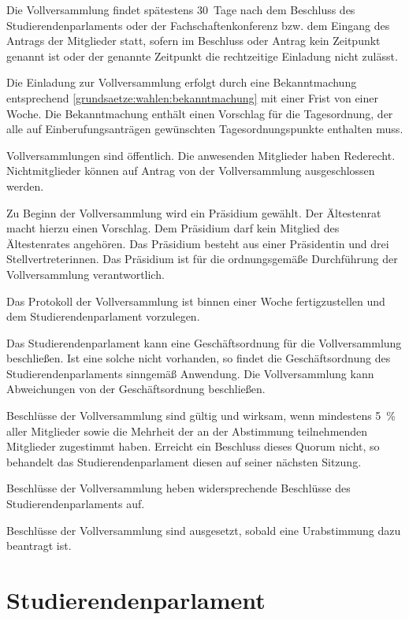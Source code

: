 \begin{contract}
Die Vollversammlung findet spätestens 30~Tage nach dem Beschluss des Studierendenparlaments oder der Fachschaftenkonferenz bzw. dem Eingang des Antrags der Mitglieder statt, sofern im Beschluss oder Antrag kein Zeitpunkt genannt ist oder der genannte Zeitpunkt die rechtzeitige Einladung nicht zulässt.

Die Einladung zur Vollversammlung erfolgt durch eine Bekanntmachung entsprechend \ref{grundsaetze:wahlen:bekanntmachung} mit einer Frist von einer Woche. Die Bekanntmachung enthält einen Vorschlag für die Tagesordnung, der alle auf Einberufungsanträgen gewünschten Tagesordnungspunkte enthalten muss.

Vollversammlungen sind öffentlich. Die anwesenden Mitglieder haben Rederecht. Nichtmitglieder können auf Antrag von der Vollversammlung ausgeschlossen werden.

Zu Beginn der Vollversammlung wird ein Präsidium gewählt. Der Ältestenrat macht hierzu einen Vorschlag. Dem Präsidium darf kein Mitglied des Ältestenrates angehören. Das Präsidium besteht aus einer Präsidentin und drei Stellvertreterinnen. Das Präsidium ist für die ordnungsgemäße Durchführung der Vollversammlung verantwortlich.

Das Protokoll der Vollversammlung ist binnen einer Woche fertigzustellen und dem Studierendenparlament vorzulegen.

Das Studierendenparlament kann eine Geschäftsordnung für die Vollversammlung beschließen. Ist eine solche nicht vorhanden, so findet die Ge\-schäfts\-ord\-nung des Studierendenparlaments sinngemäß Anwendung. Die Vollversammlung kann Abweichungen von der Geschäftsordnung beschließen.




Beschlüsse der Vollversammlung sind gültig und wirksam, wenn mindestens 5~\% aller Mitglieder sowie die Mehrheit der an der Abstimmung teilnehmenden Mitglieder zugestimmt haben. Erreicht ein Beschluss dieses Quorum nicht, so behandelt das Studierendenparlament diesen auf seiner nächsten Sitzung.

Beschlüsse der Vollversammlung heben widersprechende Beschlüsse des Studierendenparlaments auf.

Beschlüsse der Vollversammlung sind ausgesetzt, sobald eine Urabstimmung dazu beantragt ist.


%
%

\parnumberfalse \section{Studierendenparlament} \parnumbertrue


\end{contract}
